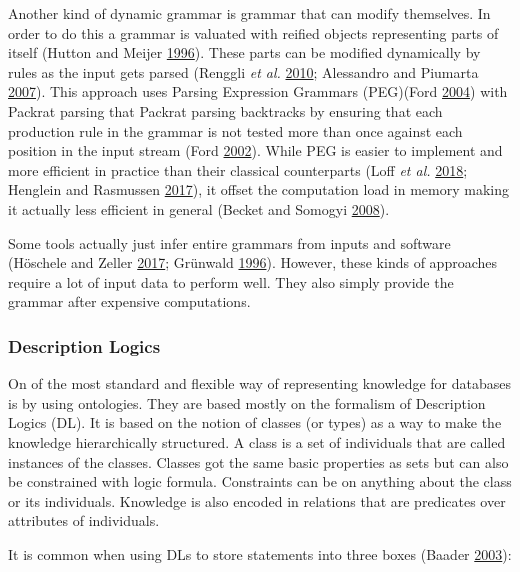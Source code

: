 \documentclass[11pt,a4paper,twoside,openright,titlepage,numbers=noenddot,headinclude,cleardoublepage=empty,openany]{scrreprt}
\theoremstyle{plain}
\theoremstyle{definition}
\theoremstyle{remark}
\begin{document}
Another kind of dynamic grammar is grammar that can modify themselves.
In order to do this a grammar is valuated with reified objects
representing parts of itself (Hutton and Meijer
\protect\hyperlink{ref-hutton_monadic_1996}{1996}). These parts can be
modified dynamically by rules as the input gets parsed (Renggli \emph{et
al.} \protect\hyperlink{ref-renggli_practical_2010}{2010}; Alessandro
and Piumarta \protect\hyperlink{ref-alessandro_ometa_2007}{2007}). This
approach uses Parsing Expression Grammars (PEG)(Ford
\protect\hyperlink{ref-ford_parsing_2004}{2004}) with Packrat parsing
that Packrat parsing backtracks by ensuring that each production rule in
the grammar is not tested more than once against each position in the
input stream (Ford \protect\hyperlink{ref-ford_packrat_2002}{2002}).
While PEG is easier to implement and more efficient in practice than
their classical counterparts (Loff \emph{et al.}
\protect\hyperlink{ref-loff_computational_2018}{2018}; Henglein and
Rasmussen \protect\hyperlink{ref-henglein_peg_2017}{2017}), it offset
the computation load in memory making it actually less efficient in
general (Becket and Somogyi
\protect\hyperlink{ref-becket_dcgs_2008}{2008}).

Some tools actually just infer entire grammars from inputs and software
(Höschele and Zeller \protect\hyperlink{ref-hoschele_mining_2017}{2017};
Grünwald \protect\hyperlink{ref-grunwald_minimum_1996}{1996}). However,
these kinds of approaches require a lot of input data to perform well.
They also simply provide the grammar after expensive computations.

\hypertarget{description-logics}{%
\subsubsection{Description Logics}\label{description-logics}}

On of the most standard and flexible way of representing knowledge for
databases is by using ontologies. They are based mostly on the formalism
of Description Logics (DL). It is based on the notion of classes (or
types) as a way to make the knowledge hierarchically structured. A class
is a set of individuals that are called instances of the classes.
Classes got the same basic properties as sets but can also be
constrained with logic formula. Constraints can be on anything about the
class or its individuals. Knowledge is also encoded in relations that
are predicates over attributes of individuals.

It is common when using DLs to store statements into three boxes (Baader
\protect\hyperlink{ref-baader_description_2003}{2003}):
\end{document}

